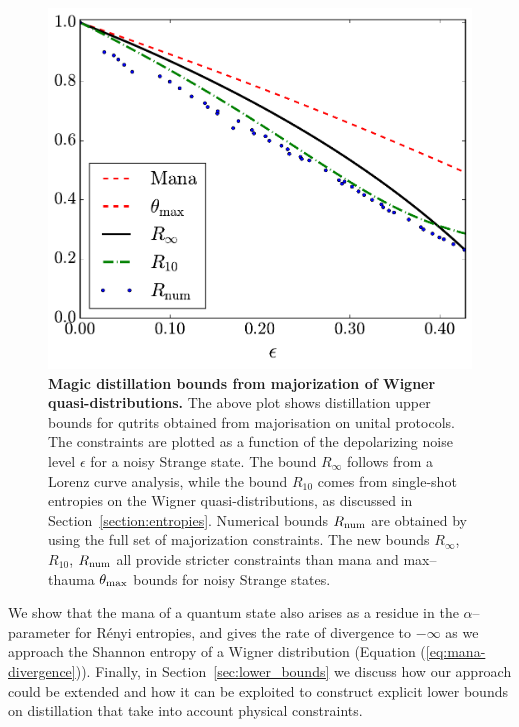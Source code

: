 \documentclass[pra,
aps,
twocolumn,
superscriptaddress,
groupedaddress,
nofootinbib,
reprint
]{revtex4-1}
\begin{document}
\begin{figure}[t]
    \centering
    \includegraphics[scale=0.35]{figs/distill_bounds.pdf}
    \caption{\textbf{Magic distillation bounds from majorization of Wigner quasi-distributions.} The above plot shows distillation upper bounds for qutrits obtained from majorisation on unital protocols. The constraints are plotted as a function of the depolarizing noise level $\epsilon$ for a noisy Strange state. The bound $R_\infty$ follows from a Lorenz curve analysis, while the bound $R_{10}$ comes from single-shot entropies on the Wigner quasi-distributions, as discussed in Section~\ref{section:entropies}. Numerical bounds $R_{\rm{num}}$ are obtained by using the full set of majorization constraints. The new bounds $R_\infty$, $R_{10}$, $R_{\rm{num}}$ all provide stricter constraints than mana and max--thauma $\theta_{\rm{max}}$ bounds for noisy Strange states.
    }
    \label{fig:distill_bounds}
\end{figure}


We show that the mana of a quantum state also arises as a residue in the $\alpha$--parameter for R\'{e}nyi entropies, and gives the rate of divergence to $-\infty$ as we approach the Shannon entropy of a Wigner distribution (Equation (\ref{eq:mana-divergence})).
Finally, in Section~\ref{sec:lower_bounds} we discuss how our approach could be extended and how it can be exploited to construct explicit lower bounds on distillation that take into account physical constraints.
\end{document}
